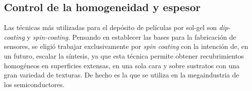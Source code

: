 	\subsection{Control de la homogeneidad y espesor}
		
		Las técnicas más utilizadas para el depósito de películas por sol-gel son \textit{dip-coating} y \textit{spin-coating}. 
		Pensando en establecer las bases para la fabricación de sensores, se eligió trabajar exclusivamente por \textit{spin coating} con la intención de, en un futuro, escalar la síntesis, ya que esta técnica permite obtener recubrimientos homogéneos en superficies extensas, en una sola cara y sobre sustratos con una gran variedad de texturas. De hecho es la que se utiliza en la megaindustria de los semiconductores.\cite{Franssila2004,Jaeger2001} 

		

